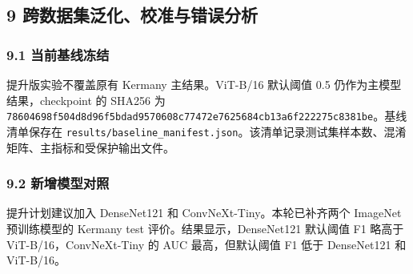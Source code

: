 \documentclass[
]{ctexart}
\begin{document}
\hypertarget{ux9644ux5f55ux9879ux76eeux63d0ux5347ux7248ux8865ux5145ux5b9eux9a8c}{%
\clearpage
\subsection{9 跨数据集泛化、校准与错误分析}\label{sec:generalization}}

\hypertarget{a.1-ux5f53ux524dux57faux7ebfux51bbux7ed3}{%
\subsubsection{9.1
当前基线冻结}\label{a.1-ux5f53ux524dux57faux7ebfux51bbux7ed3}}

提升版实验不覆盖原有 Kermany 主结果。ViT-B/16 默认阈值 0.5
仍作为主模型结果，checkpoint 的 SHA256 为
\texttt{78604698f504d8d96f5bdad9570608c77472e7625684cb13a6f222275c8381be}。基线清单保存在
\texttt{results/baseline\_manifest.json}。该清单记录测试集样本数、混淆矩阵、主指标和受保护输出文件。

\hypertarget{a.2-ux65b0ux589eux6a21ux578bux5bf9ux7167}{%
\subsubsection{9.2
新增模型对照}\label{a.2-ux65b0ux589eux6a21ux578bux5bf9ux7167}}

提升计划建议加入 DenseNet121 和 ConvNeXt-Tiny。本轮已补齐两个 ImageNet
预训练模型的 Kermany test 评价。结果显示，DenseNet121 默认阈值 F1 略高于
ViT-B/16，ConvNeXt-Tiny 的 AUC 最高，但默认阈值 F1 低于 DenseNet121 和
ViT-B/16。
\end{document}
